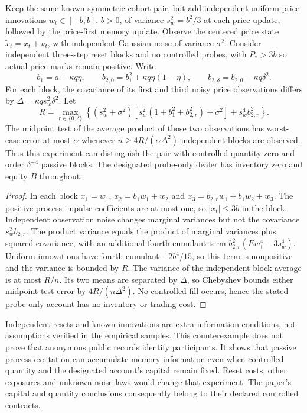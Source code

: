 \documentclass[11pt]{article}
\begin{document}
\begin{proposition}
\label{prop:passive_excitation}
Keep the same known symmetric cohort pair, but add independent uniform price innovations $w_t\in[-b,b]$, $b>0$, of variance $s_w^2=b^2/3$ at each price update, followed by the price-first memory update. Observe the centered price state $\tilde x_t=x_t+\nu_t$, with independent Gaussian noise of variance $\sigma^2$. Consider independent three-step reset blocks and no controlled probes, with $P_*>3b$ so actual price marks remain positive. Write
\[
b_1=a+\kappa q\eta,\qquad
b_{2,0}=b_1^2+\kappa q\eta(1-\eta),\qquad
b_{2,\delta}=b_{2,0}-\kappa q\delta^2.
\]
For each block, the covariance of its first and third noisy price observations differs by $\Delta=\kappa q s_w^2\delta^2$. Let
\[
R=\max_{r\in\{0,\delta\}}
\left\{(s_w^2+\sigma^2)
[s_w^2(1+b_1^2+b_{2,r}^2)+\sigma^2]
+s_w^4 b_{2,r}^2\right\}.
\]
The midpoint test of the average product of those two observations has worst-case error at most $\alpha$ whenever $n\ge4R/(\alpha\Delta^2)$ independent blocks are observed. Thus this experiment can distinguish the pair with controlled quantity zero and order $\delta^{-4}$ passive blocks. The designated probe-only dealer has inventory zero and equity $B$ throughout.
\end{proposition}
\begin{proof}
In each block $x_1=w_1$, $x_2=b_1w_1+w_2$ and $x_3=b_{2,r}w_1+b_1w_2+w_3$. The positive process impulse coefficients are at most one, so $|x_t|\le3b$ in the block. Independent observation noise changes marginal variances but not the covariance $s_w^2b_{2,r}$. The product variance equals the product of marginal variances plus squared covariance, with an additional fourth-cumulant term $b_{2,r}^2(Ew_1^4-3s_w^4)$. Uniform innovations have fourth cumulant $-2b^4/15$, so this term is nonpositive and the variance is bounded by $R$. The variance of the independent-block average is at most $R/n$. Its two means are separated by $\Delta$, so Chebyshev bounds either midpoint-test error by $4R/(n\Delta^2)$. No controlled fill occurs, hence the stated probe-only account has no inventory or trading cost.
\end{proof}

Independent resets and known innovations are extra information conditions, not assumptions verified in the empirical samples. This counterexample does not prove that anonymous public records identify participants. It shows that passive process excitation can accumulate memory information even when controlled quantity and the designated account's capital remain fixed. Reset costs, other exposures and unknown noise laws would change that experiment. The paper's capital and quantity conclusions consequently belong to their declared controlled contracts.
\end{document}
